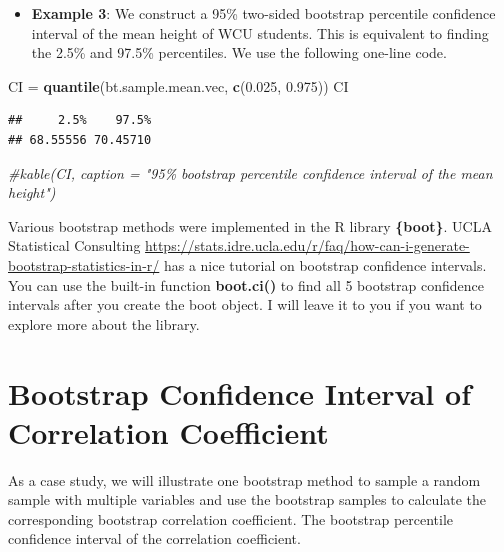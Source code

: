 \documentclass[
]{book}
\newenvironment{Shaded}{\begin{snugshade}}{\end{snugshade}}
\newcommand{\CommentTok}[1]{\textcolor[rgb]{0.56,0.35,0.01}{\textit{#1}}}
\newcommand{\FloatTok}[1]{\textcolor[rgb]{0.00,0.00,0.81}{#1}}
\newcommand{\FunctionTok}[1]{\textcolor[rgb]{0.13,0.29,0.53}{\textbf{#1}}}
\newcommand{\NormalTok}[1]{#1}
\newcommand{\OtherTok}[1]{\textcolor[rgb]{0.56,0.35,0.01}{#1}}
\providecommand{\tightlist}{%
  \setlength{\itemsep}{0pt}\setlength{\parskip}{0pt}}
\begin{document}
\begin{itemize}
\tightlist
\item
  \textbf{Example 3}: We construct a 95\% two-sided bootstrap percentile confidence interval of the mean height of WCU students. This is equivalent to finding the 2.5\% and 97.5\% percentiles. We use the following one-line code.
\end{itemize}

\begin{Shaded}
\begin{Highlighting}[]
\NormalTok{CI }\OtherTok{=} \FunctionTok{quantile}\NormalTok{(bt.sample.mean.vec, }\FunctionTok{c}\NormalTok{(}\FloatTok{0.025}\NormalTok{, }\FloatTok{0.975}\NormalTok{))}
\NormalTok{CI}
\end{Highlighting}
\end{Shaded}

\begin{verbatim}
##     2.5%    97.5% 
## 68.55556 70.45710
\end{verbatim}

\begin{Shaded}
\begin{Highlighting}[]
\CommentTok{\#kable(CI, caption = "95\% bootstrap percentile confidence interval of the mean height")}
\end{Highlighting}
\end{Shaded}

Various bootstrap methods were implemented in the R library \textbf{\{boot\}}. UCLA Statistical Consulting \url{https://stats.idre.ucla.edu/r/faq/how-can-i-generate-bootstrap-statistics-in-r/} has a nice tutorial on bootstrap confidence intervals. You can use the built-in function \textbf{boot.ci()} to find all 5 bootstrap confidence intervals after you create the boot object. I will leave it to you if you want to explore more about the library.

\hypertarget{bootstrap-confidence-interval-of-correlation-coefficient}{%
\section{Bootstrap Confidence Interval of Correlation Coefficient}\label{bootstrap-confidence-interval-of-correlation-coefficient}}

As a case study, we will illustrate one bootstrap method to sample a random sample with multiple variables and use the bootstrap samples to calculate the corresponding bootstrap correlation coefficient. The bootstrap percentile confidence interval of the correlation coefficient.
\end{document}
